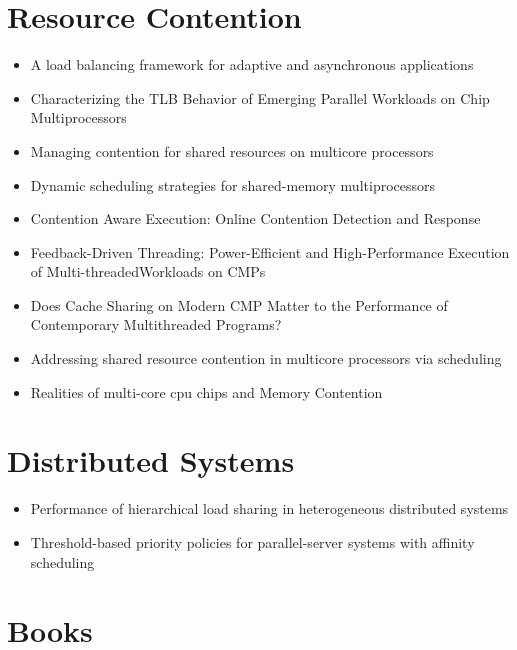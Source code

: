 \section{Resource Contention}
\label{sec:lr-resource-contention}

\begin{itemize}
\item A load balancing framework for adaptive and asynchronous
  applications \cite{Barker2004}
\item Characterizing the TLB Behavior of Emerging Parallel Workloads
  on Chip Multiprocessors \cite{Bhattacharjee2009}
\item Managing contention for shared resources on multicore processors
  \cite{Fedorova2010}
\item Dynamic scheduling strategies for shared-memory multiprocessors
  \cite{Hamidzadeh1996}
\item Contention Aware Execution: Online Contention Detection and
  Response \cite{Soffa2010}
\item Feedback-Driven Threading: Power-Efficient and High-Performance
  Execution of Multi-threadedWorkloads on CMPs \cite{Suleman2008}
\item Does Cache Sharing on Modern CMP Matter to the Performance of
  Contemporary Multithreaded Programs? \cite{Zhang2010}
\item Addressing shared resource contention in multicore processors
  via scheduling \cite{Zhuravlev2010}
\item Realities of multi-core cpu chips and Memory Contention
  \cite{Barker2009}
\end{itemize}


\section{Distributed Systems}
\label{sec:lr-distributed-systems}

\begin{itemize}
\item Performance of hierarchical load sharing in heterogeneous
  distributed systems \cite{Lo1996}
\item Threshold-based priority policies for parallel-server systems
  with affinity scheduling \cite{Squillante2001}
\end{itemize}


\section{Books}
\label{sec:lr-books}

